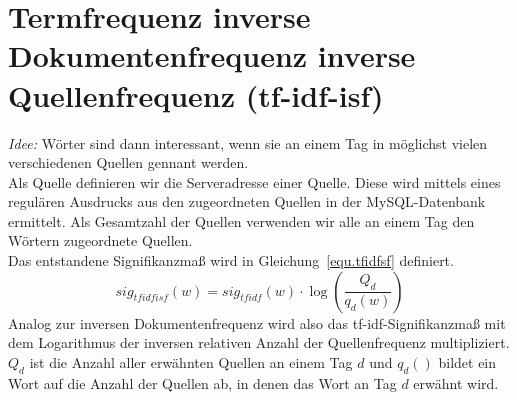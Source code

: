 \section{Termfrequenz inverse Dokumentenfrequenz inverse Quellenfrequenz (tf-idf-isf)}
\emph{Idee: } Wörter sind dann interessant, wenn sie an einem Tag in möglichst vielen verschiedenen Quellen gennant werden.\\
Als Quelle definieren wir die Serveradresse einer Quelle. Diese wird mittels eines regulären Ausdrucks aus den zugeordneten Quellen in der MySQL-Datenbank ermittelt. Als Gesamtzahl der Quellen verwenden wir alle an einem Tag den Wörtern zugeordnete Quellen.\\
Das entstandene Signifikanzmaß wird in Gleichung~\ref{equ.tfidfsf} definiert.
\begin{equation}\label{equ.tfidfsf}
sig_{tf idf isf}(w) = sig_{tf idf}(w) \cdot \log ( \frac{Q_d}{q_d(w)})
\end{equation}
Analog zur inversen Dokumentenfrequenz wird also das tf-idf-Signifikanzmaß mit dem Logarithmus der inversen relativen Anzahl der Quellenfrequenz multipliziert. $Q_d$ ist die Anzahl aller erwähnten Quellen an einem Tag $d$ und $q_d()$ bildet ein Wort auf die Anzahl der Quellen ab, in denen das Wort an Tag $d$  erwähnt wird. 
